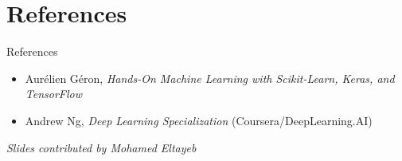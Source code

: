 \section{References}
\begin{frame}{References}
    \begin{itemize}
        \item Aurélien Géron, \textit{Hands-On Machine Learning with Scikit-Learn, Keras, and TensorFlow}
        \item Andrew Ng, \textit{Deep Learning Specialization} (Coursera/DeepLearning.AI)
    \end{itemize}

    \vspace{2em}
    
    \begin{flushleft}
        \small\textit{Slides contributed by Mohamed Eltayeb}
    \end{flushleft}
    
\end{frame}
